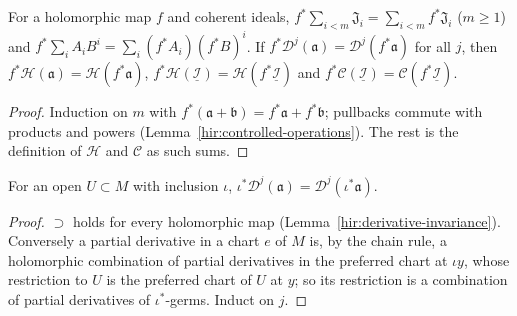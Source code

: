 \begin{lemma}
\label{mc:pullback-finite-sum}
\leanok
For a holomorphic map \(f\) and coherent ideals, \(f^*\sum_{i<m}\mathfrak J_i=\sum_{i<m}f^*\mathfrak J_i\) (\(m\ge1\)) and \(f^*\sum_iA_iB^i=\sum_i(f^*A_i)(f^*B)^i\). If
\(f^*\mathcal D^j(\mathfrak a)=\mathcal D^j(f^*\mathfrak a)\) for all \(j\), then \(f^*\mathcal H(\mathfrak a)=\mathcal H(f^*\mathfrak a)\), \(f^*\mathcal H(\underline{\mathcal I})=\mathcal H(f^*\underline{\mathcal I})\) and
\(f^*\mathcal C(\underline{\mathcal I})=\mathcal C(f^*\underline{\mathcal I})\).
\end{lemma}
\begin{proof}
\leanok
Induction on \(m\) with \(f^*(\mathfrak a+\mathfrak b)=f^*\mathfrak a+f^*\mathfrak b\); pullbacks commute with products and powers (Lemma~\ref{hir:controlled-operations}). The rest is
the definition of \(\mathcal H\) and \(\mathcal C\) as such sums.
\end{proof}

\begin{lemma}
\label{mc:derivative-open-restriction}
\leanok
For an open \(U\subset M\) with inclusion \(\iota\), \(\iota^*\mathcal D^j(\mathfrak a)=\mathcal D^j(\iota^*\mathfrak a)\).
\end{lemma}
\begin{proof}
\leanok
\(\supset\) holds for every holomorphic map (Lemma~\ref{hir:derivative-invariance}). Conversely a partial derivative in a chart \(e\) of \(M\) is, by the chain rule, a
holomorphic combination of partial derivatives in the preferred chart at \(\iota y\), whose restriction to \(U\) is the preferred chart of \(U\) at \(y\); so its
restriction is a combination of partial derivatives of \(\iota^*\)-germs. Induct on \(j\).
\end{proof}

